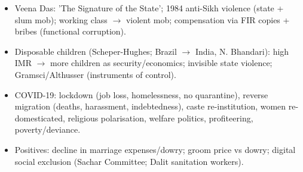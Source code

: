 \begin{QuickRevision}
\begin{itemize}
\item Veena Das: 'The Signature of the State'; 1984 anti-Sikh violence (state + slum mob); working class $\rightarrow$ violent mob; compensation via FIR copies + bribes (functional corruption).
\item Disposable children (Scheper-Hughes; Brazil $\rightarrow$ India, N. Bhandari): high IMR $\rightarrow$ more children as security/economics; invisible state violence; Gramsci/Althusser (instruments of control).
\item COVID-19: lockdown (job loss, homelessness, no quarantine), reverse migration (deaths, harassment, indebtedness), caste re-institution, women re-domesticated, religious polarisation, welfare politics, profiteering, poverty/deviance.
\item Positives: decline in marriage expenses/dowry; groom price vs dowry; digital social exclusion (Sachar Committee; Dalit sanitation workers).
\end{itemize}
\end{QuickRevision}

